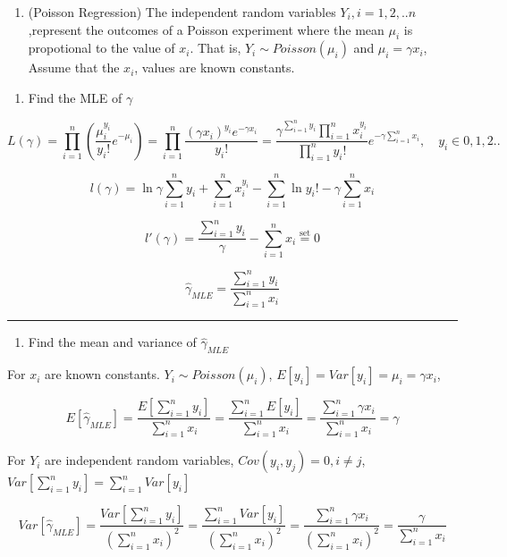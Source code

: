 \documentclass[12pt,]{article}
\title{}
\author{}
\date{}
\providecommand{\tightlist}{%
  \setlength{\itemsep}{0pt}\setlength{\parskip}{0pt}}
\begin{document}
\begin{enumerate}
\def\labelenumi{\arabic{enumi}.}
\tightlist
\item
  (Poisson Regression) The independent random variables
  \(Y_i,i=1,2,..n\),represent the outcomes of a Poisson experiment where
  the mean \(\mu_i\) is propotional to the value of \(x_i\). That is,
  \(Y_i\sim Poisson(\mu_i)\) and \(\mu_i=\gamma x_i\), Assume that the
  \(x_i\), values are known constants.
\end{enumerate}

\begin{enumerate}
\def\labelenumi{\alph{enumi})}
\tightlist
\item
  Find the MLE of \(\gamma\)
\end{enumerate}

\[L(\gamma)=\prod_{i=1}^{n}(\frac{\mu_i^{y_i}}{y_i!}e^{-\mu_i})=\prod_{i=1}^{n}\frac{(\gamma x_i)^{y_i}e^{-\gamma x_i}}{y_i!}=\frac{\gamma^{\sum_{i=1}^{n}y_i}\prod_{i=1}^{n}x_i^{y_i}}{\prod_{i=1}^{n}y_i!}e^{-\gamma\sum_{i=1}^{n}x_i},\quad y_i \in 0,1,2..\]

\[l(\gamma)=\ln\gamma\sum_{i=1}^{n}y_i+\sum_{i=1}^{n}x_i^{y_i}-\sum_{i=1}^{n}\ln y_i!-\gamma\sum_{i=1}^{n}x_i\]

\[l'(\gamma)=\frac{\sum_{i=1}^{n}y_i}\gamma-\sum_{i=1}^{n}x_i\overset{\text{set}}{=}0\]

\[\hat\gamma_{MLE}=\frac{\sum_{i=1}^{n}y_i}{\sum_{i=1}^{n}x_i}\]

\begin{center}\rule{0.5\linewidth}{\linethickness}\end{center}

\begin{enumerate}
\def\labelenumi{\alph{enumi})}
\setcounter{enumi}{1}
\tightlist
\item
  Find the mean and variance of \(\hat\gamma_{MLE}\)
\end{enumerate}

For \(x_i\) are known constants. \(Y_i\sim Poisson(\mu_i)\),
\(E[y_i]=Var[y_i]=\mu_i=\gamma x_i\),

\[E[\hat\gamma_{MLE}]=\frac{E[\sum_{i=1}^{n}y_i]}{\sum_{i=1}^{n}x_i}=\frac{\sum_{i=1}^{n}E[y_i]}{\sum_{i=1}^{n}x_i}=\frac{\sum_{i=1}^{n}\gamma x_i}{\sum_{i=1}^{n}x_i}=\gamma\]

For \(Y_i\) are independent random variables,
\(Cov(y_i,y_j)=0,i\neq j\),
\(Var[\sum_{i=1}^{n}y_i]=\sum_{i=1}^{n}Var[y_i]\)

\[Var[\hat\gamma_{MLE}]=\frac{Var[\sum_{i=1}^{n}y_i]}{(\sum_{i=1}^{n}x_i)^2}=\frac{\sum_{i=1}^{n}Var[y_i]}{(\sum_{i=1}^{n}x_i)^2}=\frac{\sum_{i=1}^{n}\gamma x_i}{(\sum_{i=1}^{n}x_i)^2}=\frac{\gamma}{\sum_{i=1}^{n}x_i}\]
\end{document}
